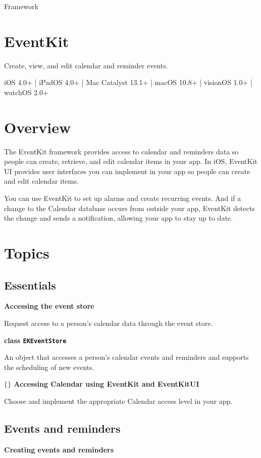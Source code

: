 \documentclass{article}
\title{}
\author{}
\date{}
\begin{document}
Framework

\section*{EventKit}
Create, view, and edit calendar and reminder events.

iOS 4.0+ | iPadOS 4.0+ | Mac Catalyst 13.1+ | macOS 10.8+ | visionOS 1.0+ | watchOS 2.0+

\section*{Overview}

The EventKit framework provides access to calendar and reminders data so people can create, retrieve, and edit calendar items in your app. In iOS, EventKit UI provides user interfaces you can implement in your app so people can create and edit calendar items.

You can use EventKit to set up alarms and create recurring events. And if a change to the Calendar database occurs from outside your app, EventKit detects the change and sends a notification, allowing your app to stay up to date.

\section*{Topics}

\subsection*{Essentials}

\textbf{Accessing the event store}

Request access to a person's calendar data through the event store.

\textbf{class \texttt{EKEventStore}}

An object that accesses a person's calendar events and reminders and supports the scheduling of new events.

\textbf{$\lbrace\rbrace$ Accessing Calendar using EventKit and EventKitUI}

Choose and implement the appropriate Calendar access level in your app.

\subsection*{Events and reminders}

\textbf{Creating events and reminders}
\end{document}
